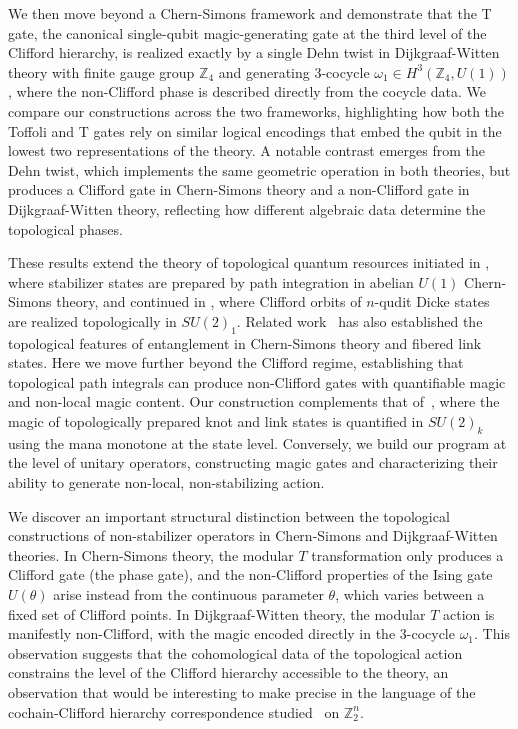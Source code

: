 \documentclass[12pt,a4paper]{article}
\begin{document}
We then move beyond a Chern-Simons framework and demonstrate that the T gate, the canonical single-qubit magic-generating gate at the third level of the Clifford hierarchy, is realized exactly by a single Dehn twist in Dijkgraaf-Witten theory with finite gauge group $\mathbb{Z}_4$ and generating 3-cocycle $\omega_1 \in H^3(\mathbb{Z}_4, U(1))$, where the non-Clifford phase is described directly from the cocycle data. We compare our constructions across the two frameworks, highlighting how both the Toffoli and T gates rely on similar logical encodings that embed the qubit in the lowest two representations of the theory. A notable contrast emerges from the Dehn twist, which implements the same geometric operation in both theories, but produces a Clifford gate in Chern-Simons theory and a non-Clifford gate in Dijkgraaf-Witten theory, reflecting how different algebraic data determine the topological phases.

These results extend the theory of topological quantum resources initiated in \cite{Salton:2016qpp}, where stabilizer states are prepared by path integration in abelian $U(1)$ Chern-Simons theory, and continued in \cite{Munizzi:2025suf}, where Clifford orbits of $n$-qudit Dicke states are realized topologically in $SU(2)_1$. Related work~\cite{Balasubramanian:2025kaf,Cummings:2025zfe} has also established the topological features of entanglement in Chern-Simons theory and fibered link states. Here we move further beyond the Clifford regime, establishing that topological path integrals can produce non-Clifford gates with quantifiable magic and non-local magic content. Our construction complements that of~\cite{Fliss:2021}, where the magic of topologically prepared knot and link states is quantified in $SU(2)_k$ using the mana monotone at the state level. Conversely, we build our program at the level of unitary operators, constructing magic gates and characterizing their ability to generate non-local, non-stabilizing action.

We discover an important structural distinction between the topological constructions of non-stabilizer operators in Chern-Simons and Dijkgraaf-Witten theories. In Chern-Simons theory, the modular $T$ transformation only produces a Clifford gate (the phase gate), and the non-Clifford properties of the Ising gate $U(\theta)$ arise instead from the continuous parameter $\theta$, which varies between a fixed set of Clifford points. In Dijkgraaf-Witten theory, the modular $T$ action is manifestly non-Clifford, with the magic encoded directly in the 3-cocycle $\omega_1$. This observation suggests that the cohomological data of the topological action constrains the level of the Clifford hierarchy accessible to the theory, an observation that would be interesting to make precise in the language of the cochain-Clifford hierarchy correspondence studied~\cite{CuiGottesmanKrishna2017} on $\mathbb{Z}_2^n$.
\end{document}
